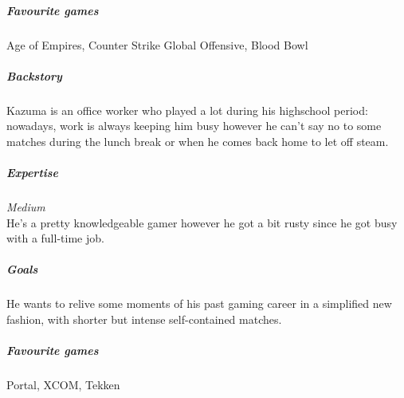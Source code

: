 \subparagraph{Favourite games}
Age of Empires, Counter Strike Global Offensive, Blood Bowl

\vspace{5mm}



\subparagraph{Backstory}
Kazuma is an office worker who played a lot during his highschool period: nowadays, work is always keeping him busy however he can't say no to some matches during the lunch break or when he comes back home to let off steam.

\subparagraph{Expertise}
\textit{Medium} \\ 
He's a pretty knowledgeable gamer however he got a bit rusty since he got busy with a full-time job.

\subparagraph{Goals}
He wants to relive some moments of his past gaming career in a simplified new fashion, with shorter but intense self-contained matches.

\subparagraph{Favourite games}
Portal, XCOM, Tekken 